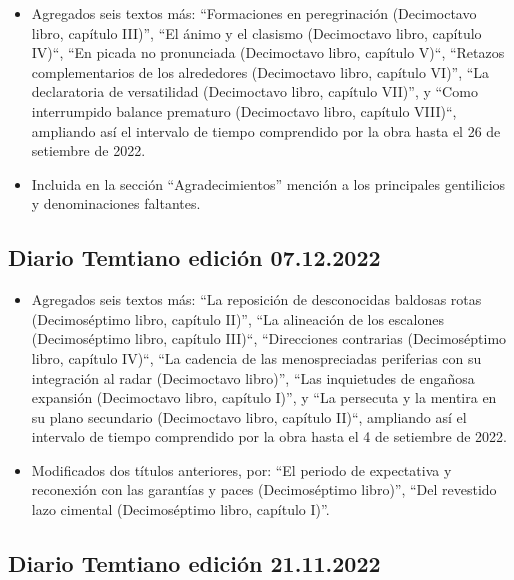 \documentclass[
]{book}
\begin{document}
\begin{itemize}
\item
  Agregados seis textos más: ``Formaciones en peregrinación (Decimoctavo libro, capítulo III)'', ``El ánimo y el clasismo (Decimoctavo libro, capítulo IV)``, ``En picada no pronunciada (Decimoctavo libro, capítulo V)``, ``Retazos complementarios de los alrededores (Decimoctavo libro, capítulo VI)'', ``La declaratoria de versatilidad (Decimoctavo libro, capítulo VII)'', y ``Como interrumpido balance prematuro (Decimoctavo libro, capítulo VIII)``, ampliando así el intervalo de tiempo comprendido por la obra hasta el 26 de setiembre de 2022.
\item
  Incluida en la sección ``Agradecimientos'' mención a los principales gentilicios y denominaciones faltantes.
\end{itemize}

\hypertarget{diario-temtiano-ediciuxf3n-07.12.2022}{%
\subsection*{Diario Temtiano edición 07.12.2022}\label{diario-temtiano-ediciuxf3n-07.12.2022}}

\begin{itemize}
\item
  Agregados seis textos más: ``La reposición de desconocidas baldosas rotas (Decimoséptimo libro, capítulo II)'', ``La alineación de los escalones (Decimoséptimo libro, capítulo III)``, ``Direcciones contrarias (Decimoséptimo libro, capítulo IV)``, ``La cadencia de las menospreciadas periferias con su integración al radar (Decimoctavo libro)'', ``Las inquietudes de engañosa expansión (Decimoctavo libro, capítulo I)'', y ``La persecuta y la mentira en su plano secundario (Decimoctavo libro, capítulo II)``, ampliando así el intervalo de tiempo comprendido por la obra hasta el 4 de setiembre de 2022.
\item
  Modificados dos títulos anteriores, por: ``El periodo de expectativa y reconexión con las garantías y paces (Decimoséptimo libro)'', ``Del revestido lazo cimental (Decimoséptimo libro, capítulo I)''.
\end{itemize}

\hypertarget{diario-temtiano-ediciuxf3n-21.11.2022}{%
\subsection*{Diario Temtiano edición 21.11.2022}\label{diario-temtiano-ediciuxf3n-21.11.2022}}
\end{document}
